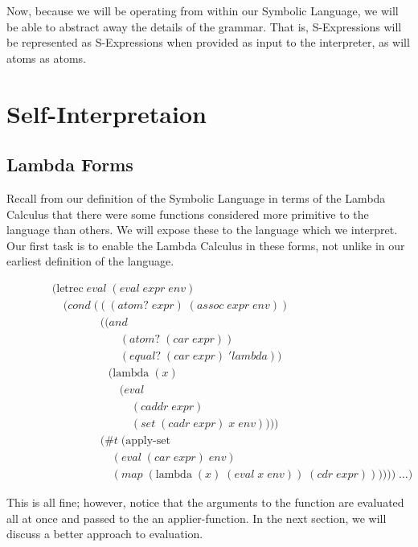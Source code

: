 Now, because we will be operating from within our Symbolic Language, we will 
be able to abstract away the details of the grammar. That is, S-Expressions 
will be represented as S-Expressions when provided as input to the 
interpreter, as will atoms as atoms.

\section{Self-Interpretaion}
\subsection{Lambda Forms}
Recall from our definition of the Symbolic Language in terms of the Lambda 
Calculus that there were some functions considered more primitive to the 
language than others. We will expose these to the language which we 
interpret. Our first task is to enable the Lambda Calculus in these forms, 
not unlike in our earliest definition of the language.

\begin{figure}[ht]
\caption{}\label{scheme}
\begin{align*}
& (\text{letrec} \; eval \; (eval \; expr \; env)
\\& \quad (cond \; (((atom? \; expr) \; (assoc \; expr \; env))
\\& \qquad \qquad \; ((and \; 
\\& \qquad \qquad \qquad (atom? \; (car \; expr)) \; 
\\& \qquad \qquad \qquad (equal? \; (car \; expr) \; 'lambda)) \; 
\\& \qquad \qquad \quad (\text{lambda} \; (x) \; 
\\& \qquad \qquad \qquad (eval \; 
\\& \qquad \qquad \qquad \quad (caddr \; expr) \; 
\\& \qquad \qquad \qquad \quad (set \; (cadr \; expr) \; x \; env))))
\\& \qquad \qquad \; (\#t \; (\text{apply-set} \; 
\\& \qquad \qquad \quad \; (eval \; (car \; expr) \; env) \; 
\\& \qquad \qquad \quad \; (map \; (\text{lambda} \; (x) \; (eval \; x \; env)) \; (cdr \; expr)))))) \; \dots)
\end{align*}
\end{figure}

This is all fine; however, notice that the arguments to the function are 
evaluated all at once and passed to the an applier-function. In the next 
section, we will discuss a better approach to evaluation.

